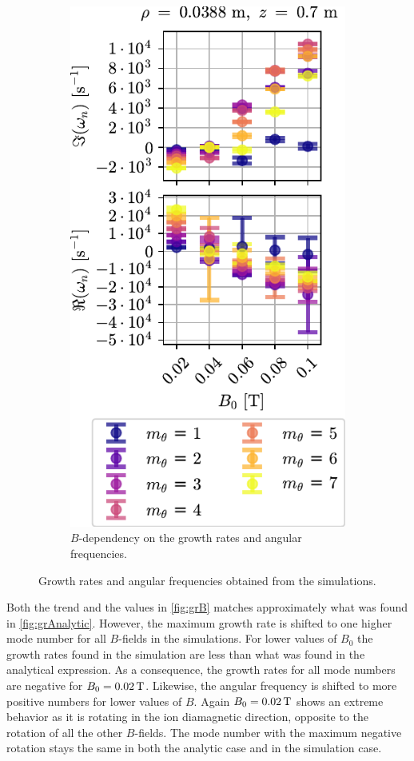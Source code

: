 \begin{figure}[htbp]
\begin{subfigure}[h]{0.45\textwidth}
        \includegraphics{fig/results/growthRates/growthRatesB0}
        \caption{$B$-dependency on the growth rates and angular frequencies.}
        \label{fig:grBModeNr}
    \end{subfigure}%
    \caption{Growth rates and angular frequencies obtained from the simulations.}
    \label{fig:obtainedGR}
\end{figure}
%
Both the trend and the values in \cref{fig:grB} matches approximately what was found in \cref{fig:grAnalytic}.
However, the maximum growth rate is shifted to one higher mode number for all $B$-fields in the simulations.
For lower values of $B_0$ the growth rates found in the simulation are less than what was found in the analytical expression.
As a consequence, the growth rates for all mode numbers are negative for $B_0=0.02\, \text{T}$.
Likewise, the angular frequency is shifted to more positive numbers for lower values of $B$.
Again $B_0=0.02\, \text{T}$ shows an extreme behavior as it is rotating in the ion diamagnetic direction, opposite to the rotation of all the other $B$-fields.
The mode number with the maximum negative rotation stays the same in both the analytic case and in the simulation case.

